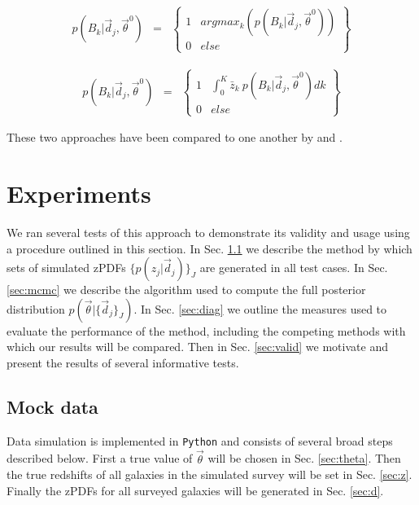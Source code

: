\documentclass[preprint]{aastex}
\begin{document}
\begin{eqnarray}
\label{eq:map}
p(B_{k}|\vec{d}_{j},\vec{\theta}^{0}) &=& \left\{\begin{array}{cc}1&argmax_{k}(p(B_{k}|\vec{d}_{j},\vec{\theta}^{0}))\\0&else\end{array}\right\}
\end{eqnarray}

\begin{eqnarray}
\label{eq:expval}
p(B_{k}|\vec{d}_{j},\vec{\theta}^{0}) &=& \left\{\begin{array}{cc}1&\int_{0}^{K} \bar{z}_{k}\ p(B_{k}|\vec{d}_{j},\vec{\theta}^{0}) dk\\0&else\end{array}\right\}
\end{eqnarray}

These two approaches have been compared to one another by \citet{hil11} and \citet{ben12}.

\clearpage
\section{Experiments}
\label{sec:exp}

We ran several tests of this approach to demonstrate its validity and usage using a procedure outlined in this section.  In Sec. \ref{sec:mock} we describe the method by which sets of simulated zPDFs $\{p(z_{j}|\vec{d}_{j})\}_{J}$ are generated in all test cases.  In Sec. \ref{sec:mcmc} we describe the algorithm used to compute the full posterior distribution $p(\vec{\theta}|\{\vec{d}_{j}\}_{J})$.  In Sec. \ref{sec:diag} we outline the measures used to evaluate the performance of the method, including the competing methods with which our results will be compared.  Then in Sec. \ref{sec:valid} we motivate and present the results of several informative tests.

\clearpage
\subsection{Mock data}
\label{sec:mock}

Data simulation is implemented in \texttt{Python} and consists of several broad steps described below.  First a true value of $\vec{\theta}$ will be chosen in Sec. \ref{sec:theta}.  Then the true redshifts of all galaxies in the simulated survey will be set in Sec. \ref{sec:z}.  Finally the zPDFs for all surveyed galaxies will be generated in Sec. \ref{sec:d}.  
\end{document}
